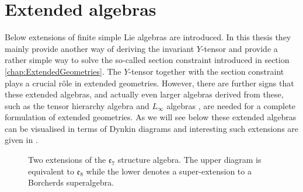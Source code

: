 \section{Extended algebras\label{sec:ExtendedAlgebras}}
Below extensions of finite simple Lie algebras are introduced. In this thesis they mainly provide another way of deriving the invariant $Y$-tensor and provide a rather simple way to solve the so-called section constraint introduced in section \ref{chap:ExtendedGeometries}. The $Y$-tensor together with the section constraint plays a crucial rôle in extended geometries. However, there are further signs that these extended algebras, and actually even larger algebras derived from these, such as the tensor hierarchy algebra \cite{Palmkvist:2013vya} and $L_\infty$ algebras \cite{Cederwall:2018aab}, are needed for a complete formulation of extended geometries. As we will see below these extended algebras can be visualised in terms of Dynkin diagrams and interesting such extensions are given in .
\begin{figure}
    \centering
    \ExtendedDynkin
    \caption{Two extensions of the $\mathfrak{e}_7$ structure algebra. The upper diagram is equivalent to $\mathfrak{e}_8$ while the lower denotes a super-extension to a Borcherds superalgebra.}
    \label{fig:ExtendedDynk}
\end{figure}

